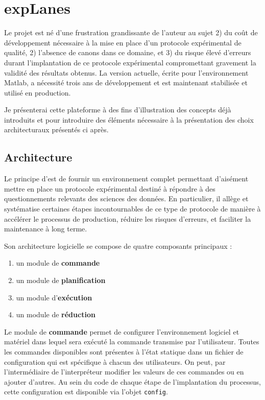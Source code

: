 \section{\nmu expLanes} \label{sec:explanes}

Le projet \explanes est né d'une frustration grandissante de l'auteur au sujet 2) du coût de développement nécessaire à la mise en place d'un protocole expérimental de qualité, 2) l'absence de canons dans ce domaine, et 3) du risque élevé d'erreurs durant l'implantation de ce protocole expérimental compromettant gravement la validité des résultats obtenus. La version actuelle, écrite pour l'environnement Matlab, a nécessité trois ans de développement et est maintenant stabilisée et utilisé en production.

Je présenterai cette plateforme à des fins d'illustration des concepts déjà introduits et pour introduire des éléments nécessaire à la présentation des choix architecturaux présentés ci après.

\subsection{Architecture}

Le principe d'\explanes est de fournir un environnement complet permettant d'aisément mettre en place un protocole expérimental destiné à répondre à des questionnements relevants des sciences des données. En particulier, il allège et systématise certaines étapes incontournables de ce type de protocole de manière à accélérer le processus de production, réduire les risques d'erreurs, et faciliter la maintenance à long terme.

Son architecture logicielle se compose de quatre composants principaux :
\begin{enumerate}
  \item un module de \textbf{commande}
  \item un module de \textbf{planification}
  \item un module d'\textbf{exécution}
  \item un module de \textbf{réduction}
\end{enumerate}

Le module de \textbf{commande} permet de configurer l'environnement logiciel et matériel dans lequel sera exécuté la commande transmise par l'utilisateur. Toutes les commandes disponibles sont présentes à l'état statique dans un fichier de configuration qui est spécifique à chacun des utilisateurs. On peut, par l'intermédiaire de l'interpréteur modifier les valeurs de ces commandes ou en ajouter d'autres. Au sein du code de chaque étape de l'implantation du processus, cette configuration est disponible via l'objet \texttt{config}.


